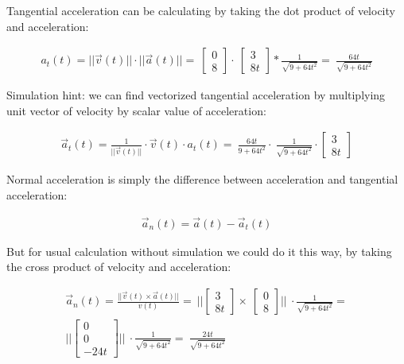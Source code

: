 \documentclass{article}
\begin{document}
Tangential acceleration can be calculating by taking the dot product of velocity and acceleration:

\begin{align}
    a_t(t) = || \vec{v}(t) || \cdot || \vec{a}(t) || = \
    \begin{bmatrix}
        0 \\
        8
    \end{bmatrix} \cdot \
    \begin{bmatrix}
        3 \\
        8t
    \end{bmatrix} * \frac{1}{\sqrt{9 + 64t^2}} = \
    \frac{64t}{\sqrt{9 + 64t^2}}
\end{align}

Simulation hint: we can find vectorized tangential acceleration by multiplying unit vector of velocity by scalar value of acceleration:

\begin{align}
    \vec{a}_t(t) = \frac{1}{|| \vec{v}(t) ||} \cdot \vec{v}(t) \cdot a_t(t) = \
    \frac{64t}{9 + 64t^2} \cdot \
    \frac{1}{\sqrt{9 + 64t^2}} \cdot \begin{bmatrix}
        3 \\
        8t
    \end{bmatrix}
\end{align}

Normal acceleration is simply the difference between acceleration and tangential acceleration:

\begin{align}
    \vec{a}_n(t) = \vec{a}(t) - \vec{a}_t(t)
\end{align}

But for usual calculation without simulation we could do it this way, by taking the cross product of velocity and acceleration:

\begin{align}
    \vec{a}_n(t) = \frac{|| \vec{v}(t) \times \vec{a}(t) ||}{v(t)} = \
    || \begin{bmatrix}
        3 \\
        8t
    \end{bmatrix} \times \
    \begin{bmatrix}
        0 \\
        8
    \end{bmatrix} || \
    \cdot \frac{1}{\sqrt{9 + 64t^2}} = \\
    || \begin{bmatrix}
        0 \\
        0 \\
        -24t
    \end{bmatrix} || \
    \cdot \frac{1}{\sqrt{9 + 64t^2}} = \
    \frac{24t}{\sqrt{9 + 64t^2}}
\end{align}
\end{document}
